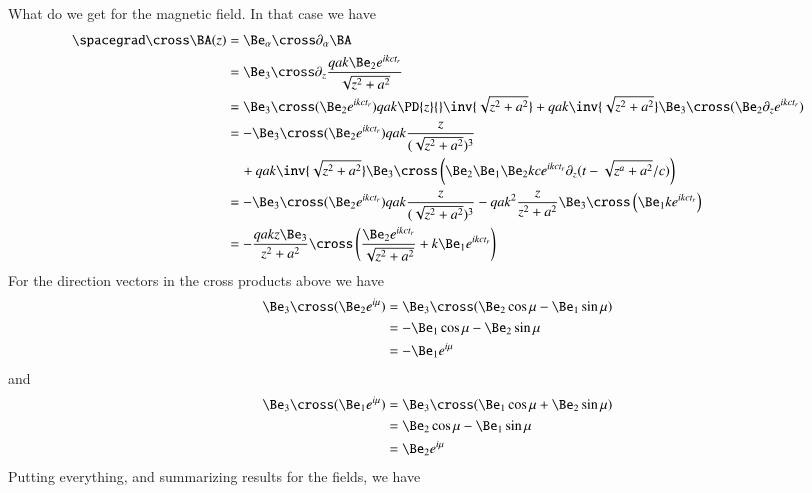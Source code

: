 {What do we get for the magnetic field.  In that case we have
%
\begin{equation}\label{eqn:relativisticElectrodynamicsExamReflection:1190}
\begin{aligned}
\spacegrad \cross \BA(z)
&=
\Be_\alpha \cross \partial_\alpha \BA \\
&=
\Be_3 \cross \partial_z \frac{q a k \Be_2 e^{i k c t_r} }{\sqrt{z^2 + a^2}}  \\
&=
\Be_3 \cross (\Be_2 e^{i  k c t_r} ) q a  k \PD{z}{} \inv{\sqrt{z^2 + a^2}}
+
q a  k \inv{\sqrt{z^2 + a^2}} \Be_3 \cross (\Be_2 \partial_z e^{i  k c t_r} ) \\
&=
-\Be_3 \cross (\Be_2 e^{i  k c t_r} ) q a  k \frac{z}{(\sqrt{z^2 + a^2})^3} \\
&\quad +
q a  k \inv{\sqrt{z^2 + a^2}} \Be_3 \cross \left( \Be_2 \Be_1 \Be_2 k c e^{i  k c t_r} \partial_z ( t - \sqrt{z^a + a^2}/c ) \right) \\
&=
-\Be_3 \cross (\Be_2 e^{i  k c t_r} ) q a  k \frac{z}{(\sqrt{z^2 + a^2})^3}
-
q a  k^2 \frac{z}{z^2 + a^2} \Be_3 \cross \left( \Be_1 k e^{i  k c t_r} \right) \\
&=
-\frac{q a k z \Be_3}{z^2 + a^2} \cross \left(
\frac{ \Be_2 e^{i k c t_r} }{\sqrt{z^2 + a^2}} + k \Be_1 e^{i k c t_r}
\right)
\end{aligned}
\end{equation}
%
For the direction vectors in the cross products above we have
%
\begin{equation}\label{eqn:relativisticElectrodynamicsExamReflection:1210}
\begin{aligned}
\Be_3 \cross (\Be_2 e^{i \mu})
&=
\Be_3 \cross (\Be_2 \cos\mu - \Be_1 \sin\mu) \\
&=
-\Be_1 \cos\mu - \Be_2 \sin\mu \\
&=
-\Be_1 e^{i \mu}
\end{aligned}
\end{equation}
%
and
%
\begin{equation}\label{eqn:relativisticElectrodynamicsExamReflection:1230}
\begin{aligned}
\Be_3 \cross (\Be_1 e^{i \mu})
&=
\Be_3 \cross (\Be_1 \cos\mu + \Be_2 \sin\mu) \\
&=
\Be_2 \cos\mu - \Be_1 \sin\mu \\
&=
\Be_2 e^{i \mu}
\end{aligned}
\end{equation}
%
Putting everything, and summarizing results for the fields, we have
%
\begin{equation}\label{eqn:relativisticElectrodynamicsExamReflection:250}

\end{equation}}
